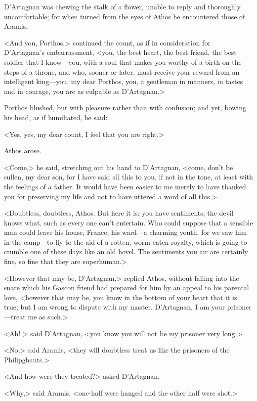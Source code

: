 D'Artagnan was chewing the stalk of a flower, unable to reply and thoroughly uncomfortable; for when turned from the eyes of Athos he encountered those of Aramis.

<And you, Porthos,> continued the count, as if in consideration for D'Artagnan's embarrassment, <you, the best heart, the best friend, the best soldier that I know—you, with a soul that makes you worthy of a birth on the steps of a throne, and who, sooner or later, must receive your reward from an intelligent king—you, my dear Porthos, you, a gentleman in manners, in tastes and in courage, you are as culpable as D'Artagnan.>

Porthos blushed, but with pleasure rather than with confusion; and yet, bowing his head, as if humiliated, he said:

<Yes, yes, my dear count, I feel that you are right.>

Athos arose.

<Come,> he said, stretching out his hand to D'Artagnan, <come, don't be sullen, my dear son, for I have said all this to you, if not in the tone, at least with the feelings of a father. It would have been easier to me merely to have thanked you for preserving my life and not to have uttered a word of all this.>

<Doubtless, doubtless, Athos. But here it is: you have sentiments, the devil knows what, such as every one can't entertain. Who could suppose that a sensible man could leave his house, France, his ward—a charming youth, for we saw him in the camp—to fly to the aid of a rotten, worm-eaten royalty, which is going to crumble one of these days like an old hovel. The sentiments you air are certainly fine, so fine that they are superhuman.>

<However that may be, D'Artagnan,> replied Athos, without falling into the snare which his Gascon friend had prepared for him by an appeal to his parental love, <however that may be, you know in the bottom of your heart that it is true; but I am wrong to dispute with my master. D'Artagnan, I am your prisoner—treat me as such.>

<Ah! > said D'Artagnan, <you know you will not be my prisoner very long.>

<No,> said Aramis, <they will doubtless treat us like the prisoners of the Philipghauts.>

<And how were they treated?> asked D'Artagnan.

<Why,> said Aramis, <one-half were hanged and the other half were shot.>

